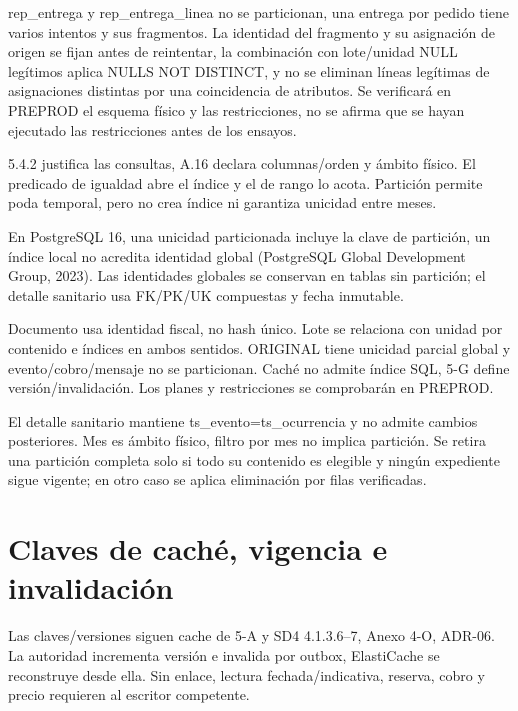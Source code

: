rep\_entrega y rep\_entrega\_linea no se particionan, una entrega por pedido tiene varios intentos y sus fragmentos. La identidad del fragmento y su asignación de origen se fijan antes de reintentar, la combinación con lote/unidad NULL legítimos aplica NULLS NOT DISTINCT, y no se eliminan líneas legítimas de asignaciones distintas por una coincidencia de atributos. Se verificará en PREPROD el esquema físico y las restricciones, no se afirma que se hayan ejecutado las restricciones antes de los ensayos.

5.4.2 justifica las consultas, A.16 declara columnas/orden y ámbito físico. El predicado de igualdad abre el índice y el de rango lo acota. Partición permite poda temporal, pero no crea índice ni garantiza unicidad entre meses.

En PostgreSQL 16, una unicidad particionada incluye la clave de partición, un índice local no acredita identidad global (PostgreSQL Global Development Group, 2023). Las identidades globales se conservan en tablas sin partición; el detalle sanitario usa FK/PK/UK compuestas y fecha inmutable.


Documento usa identidad fiscal, no hash único. Lote se relaciona con unidad por contenido e índices en ambos sentidos. ORIGINAL tiene unicidad parcial global y evento/cobro/mensaje no se particionan. Caché no admite índice SQL, 5-G define versión/invalidación. Los planes y restricciones se comprobarán en PREPROD.


El detalle sanitario mantiene ts\_evento=ts\_ocurrencia y no admite cambios posteriores. Mes es ámbito físico, filtro por mes no implica partición. Se retira una partición completa solo si todo su contenido es elegible y ningún expediente sigue vigente; en otro caso se aplica eliminación por filas verificadas.

\section{Claves de caché, vigencia e invalidación}
\label{anexo-5g}

Las claves/versiones siguen cache de 5-A y SD4 4.1.3.6–7, Anexo 4-O, ADR-06. La autoridad incrementa versión e invalida por outbox, ElastiCache se reconstruye desde ella. Sin enlace, lectura fechada/indicativa, reserva, cobro y precio requieren al escritor competente.

